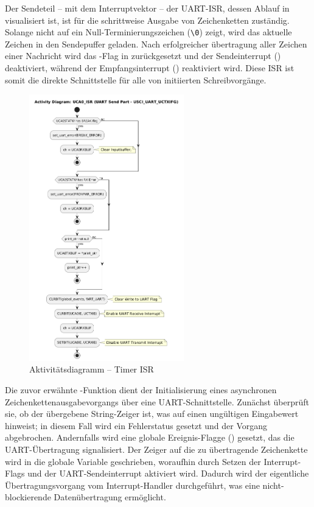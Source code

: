 \newpage
Der Sendeteil -- mit dem Interruptvektor  -- der UART-ISR, dessen Ablauf in  visualisiert ist, ist f\"ur die schrittweise Ausgabe von Zeichenketten zust\"andig. Solange  nicht auf ein Null-Terminierungszeichen (\grq \texttt{\textbackslash 0}\grq) zeigt, wird das aktuelle Zeichen in den Sendepuffer  geladen. Nach erfolgreicher \"ubertragung aller Zeichen einer Nachricht wird das -Flag in  zur\"uckgesetzt und der Sendeinterrupt () deaktiviert, w\"ahrend der Empfangsinterrupt () reaktiviert wird. Diese ISR ist somit die direkte Schnittstelle f\"ur alle von  initiierten Schreibvorg\"ange.

\begin{figure}[h!]
	\centering
	\includegraphics[width=0.60\textwidth]{../Bilder/observer_activity_diagram_eusci_send.png}
	\caption{Aktivit\"atsdiagramm -- Timer ISR}
	\label{fig:activity_diagram_uart_isr_send}
\end{figure}

\newpage
Die zuvor erw\"ahnte -Funktion dient der Initialisierung eines asynchronen Zeichenkettenausgabevorgangs \"uber eine UART-Schnittstelle. Zun\"achst \"uberpr\"uft sie, ob der \"ubergebene String-Zeiger   ist, was auf einen ung\"ultigen Eingabewert hinweist; in diesem Fall wird ein Fehlerstatus gesetzt und der Vorgang abgebrochen. Andernfalls wird eine globale Ereignis-Flagge () gesetzt, das die UART-\"Ubertragung signalisiert. Der Zeiger auf die zu \"ubertragende Zeichenkette wird in die globale Variable  geschrieben, woraufhin durch Setzen der Interrupt-Flags  und  der UART-Sendeinterrupt aktiviert wird. Dadurch wird der eigentliche \"Ubertragungsvorgang vom Interrupt-Handler durchgef\"uhrt, was eine nicht-blockierende Daten\"ubertragung erm\"oglicht.

